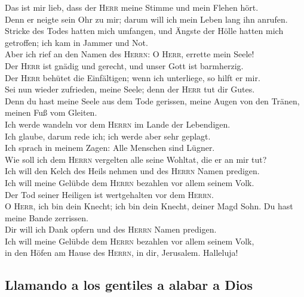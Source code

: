  Das ist mir lieb, dass der \textsc{Herr} meine Stimme und
mein Flehen hört.\\
 Denn er neigte sein Ohr zu mir; darum will ich mein Leben
lang ihn anrufen.\\
 Stricke des Todes hatten mich umfangen, und Ängste der
Hölle hatten mich getroffen; ich kam in Jammer und Not.\\
 Aber ich rief an den Namen des \textsc{Herrn}: O
\textsc{Herr}, errette mein Seele!\\
 Der \textsc{Herr} ist gnädig und gerecht, und unser Gott
ist barmherzig.\\
 Der \textsc{Herr} behütet die Einfältigen; wenn ich
unterliege, so hilft er mir.\\
 Sei nun wieder zufrieden, meine Seele; denn der
\textsc{Herr} tut dir Gutes.\\
 Denn du hast meine Seele aus dem Tode gerissen, meine
Augen von den Tränen, meinen Fuß vom Gleiten.\\
 Ich werde wandeln vor dem \textsc{Herrn} im Lande der
Lebendigen.\\
 Ich glaube, darum rede ich; ich werde aber sehr
geplagt.\\
 Ich sprach in meinem Zagen: Alle Menschen sind Lügner.\\
 Wie soll ich dem \textsc{Herrn} vergelten alle seine
Wohltat, die er an mir tut?\\
 Ich will den Kelch des Heils nehmen und des
\textsc{Herrn} Namen predigen.\\
 Ich will meine Gelübde dem \textsc{Herrn} bezahlen vor
allem seinem Volk.\\
 Der Tod seiner Heiligen ist wertgehalten vor dem
\textsc{Herrn}.\\
 O \textsc{Herr}, ich bin dein Knecht; ich bin dein
Knecht, deiner Magd Sohn. Du hast meine Bande zerrissen.\\
 Dir will ich Dank opfern und des \textsc{Herrn} Namen
predigen.\\
 Ich will meine Gelübde dem \textsc{Herrn} bezahlen vor
allem seinem Volk,\\
 in den Höfen am Hause des \textsc{Herrn}, in dir,
Jerusalem. Halleluja!

\hypertarget{llamando-a-los-gentiles-a-alabar-a-dios}{%
\subsection{Llamando a los gentiles a alabar a
Dios}\label{llamando-a-los-gentiles-a-alabar-a-dios}}

